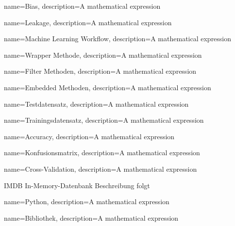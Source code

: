 {
        name=Bias,
        description={A mathematical expression}
}

{
        name=Leakage,
        description={A mathematical expression}
}

{
        name=Machine Learning Workflow,
        description={A mathematical expression}
}

{
        name=Wrapper Methode,
        description={A mathematical expression}
}

{
        name=Filter Methoden,
        description={A mathematical expression}
}

{
        name=Embedded Methoden,
        description={A mathematical expression}
}

{
        name=Testdatensatz,
        description={A mathematical expression}
}

{
        name=Trainingsdatensatz,
        description={A mathematical expression}
}

{
        name=Accuracy,
        description={A mathematical expression}
}

{
        name=Konfusionsmatrix,
        description={A mathematical expression}
}

{
        name=Cross-Validation,
        description={A mathematical expression}
}


\newglossaryentrywithacronym
{IMDB}
{In-Memory-Datenbank}
{Beschreibung folgt}



{
        name=Python,
        description={A mathematical expression}
}

{
        name=Bibliothek,
        description={A mathematical expression}
}


